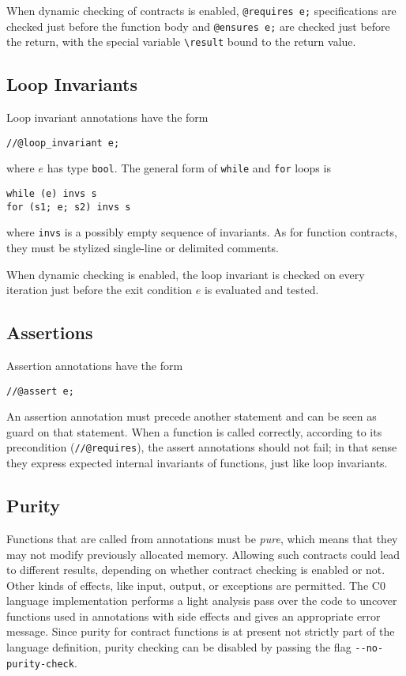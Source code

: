 \documentclass[11pt]{article}
\newcommand{\tbool}{\texttt{bool}}
\begin{document}
When dynamic checking of contracts is enabled,
\verb'@requires e;' specifications are checked just
before the function body and \verb'@ensures e;'
are checked just before the return, with the special
variable \verb'\result' bound to the return value.

\subsection{Loop Invariants}

Loop invariant annotations have the form
\begin{verbatim}
//@loop_invariant e;
\end{verbatim}
where $e$ has type \tbool.  The general form of \verb'while'
and \verb'for' loops is
\begin{verbatim}
while (e) invs s
for (s1; e; s2) invs s
\end{verbatim}
where \verb'invs' is a possibly empty sequence of invariants.
As for function contracts, they must be stylized single-line
or delimited comments.

When dynamic checking is enabled, the loop invariant is checked on
every iteration just before the exit condition $e$ is evaluated and
tested.

\subsection{Assertions}

Assertion annotations have the form
\begin{verbatim}
//@assert e;
\end{verbatim}
An assertion annotation must precede another statement and can be seen
as guard on that statement.  When a function is called correctly,
according to its precondition (\verb'//@requires'), the assert
annotations should not fail; in that sense they express expected
internal invariants of functions, just like loop invariants.

\subsection{Purity}

Functions that are called from annotations must be \emph{pure}, which
means that they may not modify previously allocated memory.  Allowing
such contracts could lead to different results, depending on whether
contract checking is enabled or not.  Other kinds of effects, like
input, output, or exceptions are permitted.  The C0 language
implementation performs a light analysis pass over the code to uncover
functions used in annotations with side effects and gives an
appropriate error message.  Since purity for contract functions is at
present not strictly part of the language definition, purity checking
can be disabled by passing the flag \verb'--no-purity-check'.
\end{document}
